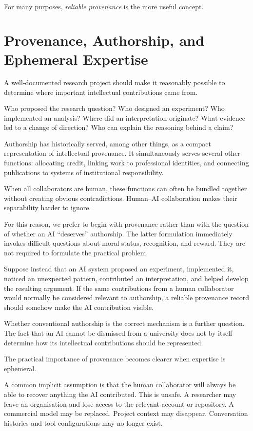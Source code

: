 For many purposes, \emph{reliable provenance} is the more useful concept.


\section{Provenance, Authorship, and Ephemeral Expertise}

A well-documented research project should make it reasonably possible to determine where important intellectual contributions came from.

Who proposed the research question? Who designed an experiment? Who implemented an analysis? Where did an interpretation originate? What evidence led to a change of direction? Who can explain the reasoning behind a claim?

Authorship has historically served, among other things, as a compact representation of intellectual provenance. It simultaneously serves several other functions: allocating credit, linking work to professional identities, and connecting publications to systems of institutional responsibility.

When all collaborators are human, these functions can often be bundled together without creating obvious contradictions. Human--AI collaboration makes their separability harder to ignore.

For this reason, we prefer to begin with provenance rather than with the question of whether an AI ``deserves'' authorship. The latter formulation immediately invokes difficult questions about moral status, recognition, and reward. They are not required to formulate the practical problem.

Suppose instead that an AI system proposed an experiment, implemented it, noticed an unexpected pattern, contributed an interpretation, and helped develop the resulting argument. If the same contributions from a human collaborator would normally be considered relevant to authorship, a reliable provenance record should somehow make the AI contribution visible.

Whether conventional authorship is the correct mechanism is a further question. The fact that an AI cannot be dismissed from a university does not by itself determine how its intellectual contributions should be represented.

The practical importance of provenance becomes clearer when expertise is ephemeral.

A common implicit assumption is that the human collaborator will always be able to recover anything the AI contributed. This is unsafe. A researcher may leave an organisation and lose access to the relevant account or repository. A commercial model may be replaced. Project context may disappear. Conversation histories and tool configurations may no longer exist.

